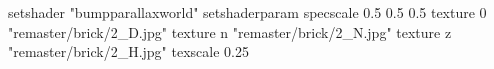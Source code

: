 setshader "bumpparallaxworld"
setshaderparam specscale 0.5 0.5 0.5
    texture 0 "remaster/brick/2_D.jpg"
    texture n "remaster/brick/2_N.jpg"
    texture z "remaster/brick/2_H.jpg"
    texscale 0.25